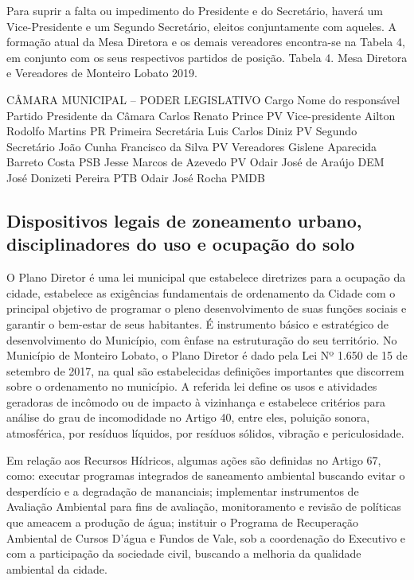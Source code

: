 Para suprir a falta ou impedimento do Presidente e do Secretário, haverá um Vice-Presidente e um Segundo Secretário, eleitos conjuntamente com aqueles. A formação atual da Mesa Diretora e os demais vereadores encontra-se na Tabela 4, em conjunto com os seus respectivos partidos de posição.
Tabela 4. Mesa Diretora e Vereadores de Monteiro Lobato 2019.

CÂMARA MUNICIPAL – PODER LEGISLATIVO
Cargo	Nome do responsável	Partido
Presidente da Câmara	Carlos Renato Prince 	PV 
Vice-presidente	Ailton Rodolfo Martins 	PR 
Primeira Secretária	Luis Carlos Diniz 	PV 
Segundo Secretário	João Cunha Francisco da Silva 	PV 
Vereadores	Gislene Aparecida Barreto Costa	PSB
	Jesse Marcos de Azevedo	PV
	Odair José de Araújo	DEM
	José Donizeti Pereira	PTB
	Odair José Rocha	PMDB

\subsection{Dispositivos legais de zoneamento urbano, disciplinadores do uso e ocupação do solo}
O Plano Diretor é uma lei municipal que estabelece diretrizes para a ocupação da cidade, estabelece as exigências fundamentais de ordenamento da Cidade com o principal objetivo de programar o pleno desenvolvimento de suas funções sociais e garantir o bem-estar de seus habitantes. É instrumento básico e estratégico de desenvolvimento do Município, com ênfase na estruturação do seu território.
No Município de Monteiro Lobato, o Plano Diretor é dado pela Lei Nº 1.650 de 15 de setembro de 2017, na qual são estabelecidas definições importantes que discorrem sobre o ordenamento no município. A referida lei define os usos e atividades geradoras de incômodo ou de impacto à vizinhança e estabelece critérios para análise do grau de incomodidade no Artigo 40, entre eles, poluição sonora, atmosférica, por resíduos líquidos, por resíduos sólidos, vibração e periculosidade.

Em relação aos Recursos Hídricos, algumas ações são definidas no Artigo 67, como: executar programas integrados de saneamento ambiental buscando evitar o desperdício e a degradação de mananciais; implementar instrumentos de Avaliação Ambiental para fins de avaliação, monitoramento e revisão de políticas que ameacem a produção de água; instituir o Programa de Recuperação Ambiental de Cursos D’água e Fundos de Vale, sob a coordenação do Executivo e com a participação da sociedade civil, buscando a melhoria da qualidade ambiental da cidade.

